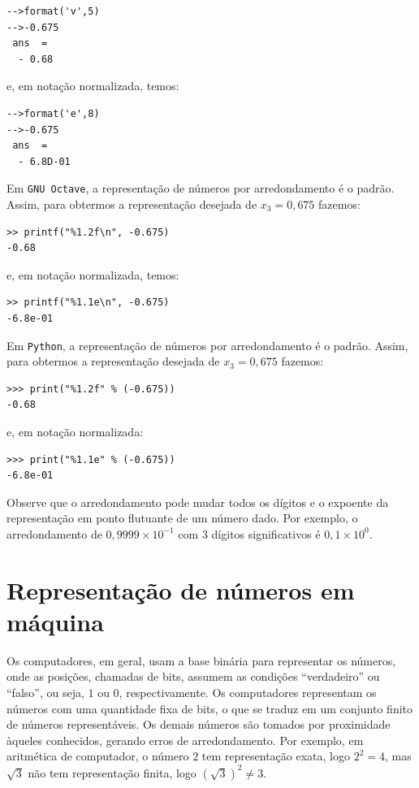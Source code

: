 \begin{sol}
\begin{itemize}
\begin{verbatim}
-->format('v',5)
-->-0.675
 ans  =
  - 0.68  
\end{verbatim}
e, em notação normalizada, temos:
\begin{verbatim}
-->format('e',8)
-->-0.675
 ans  =
  - 6.8D-01  
\end{verbatim}
\fi
\ifisoctave
Em \verb+GNU Octave+, a representação de números por arredondamento é o padrão. Assim, para obtermos a representação desejada de $x_3 = 0,675$ fazemos:
\begin{verbatim}
>> printf("%1.2f\n", -0.675)
-0.68
\end{verbatim}
e, em notação normalizada, temos:
\begin{verbatim}
>> printf("%1.1e\n", -0.675)
-6.8e-01
\end{verbatim}
\fi
\ifispython
Em \verb+Python+, a representação de números por arredondamento é o padrão. Assim, para obtermos a representação desejada de $x_3 = 0,675$ fazemos:
\begin{verbatim}
>>> print("%1.2f" % (-0.675))
-0.68  
\end{verbatim}
e, em notação normalizada:
\begin{verbatim}
>>> print("%1.1e" % (-0.675))
-6.8e-01  
\end{verbatim}
\fi
  \end{itemize}
\end{sol}

\begin{obs}
  Observe que o arredondamento pode mudar todos os dígitos e o expoente da representação em ponto flutuante de um número dado. Por exemplo, o arredondamento de $0,9999\times 10^{-1}$ com $3$ dígitos significativos é $0,1\times 10^{0}$.
\end{obs}


\section{Representação de números em máquina}

Os computadores, em geral, usam a base binária para representar os números, onde as posições, chamadas de bits, assumem as condições ``verdadeiro'' ou ``falso'', ou seja, $1$ ou $0$, respectivamente. Os computadores representam os números com uma quantidade fixa de bits, o que se traduz em um conjunto finito de números representáveis. Os demais números são tomados por proximidade àqueles conhecidos, gerando erros de arredondamento. Por exemplo, em aritmética de computador, o número $2$ tem representação exata, logo $2^2=4$, mas $\sqrt{3}$ não tem representação finita, logo $(\sqrt{3})^2\neq 3$. 

